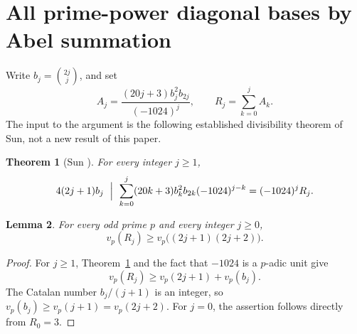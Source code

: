 \documentclass[11pt,a4paper]{article}
\newtheorem{theorem}{Theorem}[section]
\newtheorem{lemma}[theorem]{Lemma}
\theoremstyle{remark}\newtheorem{remark}[theorem]{Remark}
\begin{document}
\section{All prime-power diagonal bases by Abel summation}
\label{sec:abel}

Write \(b_j=\binom{2j}{j}\), and set
\[
 A_j=\frac{(20j+3)b_j^2b_{2j}}{(-1024)^j},\qquad
 R_j=\sum_{k=0}^j A_k.
\]
The input to the argument is the following established divisibility theorem
of Sun, not a new result of this paper.

\begin{theorem}[Sun {\cite[Theorem~5, (5)]{Sun2013}}]\label{sun:partial}
For every integer \(j\ge1\),
\[
 4(2j+1)b_j\ \Bigm|\
 \sum_{k=0}^j(20k+3)b_k^2b_{2k}(-1024)^{j-k}
 =(-1024)^jR_j.
\]
\end{theorem}

\begin{lemma}\label{abel:partialbound}
For every odd prime \(p\) and every integer \(j\ge0\),
\[
                  v_p(R_j)\ge v_p\bigl((2j+1)(2j+2)\bigr).
\]
\end{lemma}
\begin{proof}
For \(j\ge1\), Theorem~\ref{sun:partial} and the fact that \(-1024\)
is a \(p\)-adic unit give
\[
 v_p(R_j)\ge v_p(2j+1)+v_p(b_j).
\]
The Catalan number \(b_j/(j+1)\) is an integer, so
\(v_p(b_j)\ge v_p(j+1)=v_p(2j+2)\).
For \(j=0\), the assertion follows directly from \(R_0=3\).
\end{proof}
\end{document}
